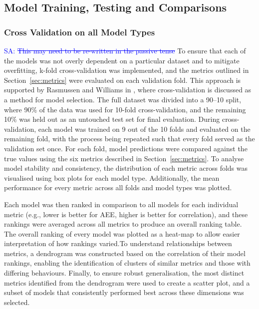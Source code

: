 \documentclass[10pt]{article}
\newcommand{\Sarp}[1]{{\textcolor{blue}{{SA: #1}} }}
\begin{document}
\subsection{Model Training, Testing and Comparisons}
%
%
\subsubsection{Cross Validation on all Model Types}
\Sarp{\sout{This may need to be re-written in the passive tense}}
To ensure that each of the models was not overly dependent on a particular dataset and to mitigate overfitting, 
k-fold cross-validation was implemented, and the metrics outlined in Section~\ref{sec:metrics} were evaluated on each validation fold. 
This approach is supported by Rasmussen and Williams in \cite[Ch.5]{bible}, where cross-validation is discussed as a method for model selection.
The full dataset was divided into a 90--10 split, where 90\% of the data was used for 10-fold cross-validation, and the remaining 10\% was held out 
as an untouched test set for final evaluation. During cross-validation, each model was trained on 9 out of the 10 folds and evaluated on the remaining fold, 
with the process being repeated such that every fold served as the validation set once. For each fold, model predictions were compared against the true values using the six metrics
described in Section~\ref{sec:metrics}.
To analyse model stability and consistency, the distribution of each metric across folds was visualised using box plots for each model type. Additionally, the mean performance for every metric 
across all folds and model types was plotted.

Each model was then ranked in comparison to all models for each individual metric (e.g., lower is better for AEE, higher is better for correlation), 
and these rankings were averaged across all metrics to produce an overall ranking table. The overall ranking of every model was plotted as a heat-map to allow easier interpretation
of how rankings varied.To understand relationships between metrics, a dendrogram was constructed based on the correlation of their model rankings, 
enabling the identification of clusters of similar metrics and those with differing behaviours. 
Finally, to ensure robust generalisation, the most distinct metrics identified from the dendrogram were used to 
create a scatter plot, and a subset of models that consistently performed best across these dimensions was selected.
\end{document}
